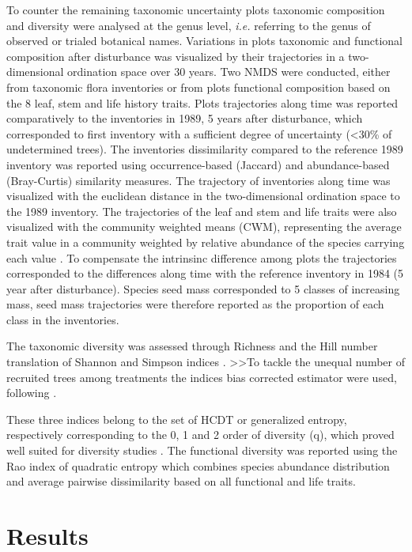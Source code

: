 \documentclass[fleqn,10pt]{ArtEcoFoG} %
\theoremstyle{definition}
\theoremstyle{definition}
\theoremstyle{definition}
\theoremstyle{remark}
\begin{document}
To counter the remaining taxonomic uncertainty plots taxonomic
composition and diversity were analysed at the genus level, \emph{i.e.}
referring to the genus of observed or trialed botanical names.
Variations in plots taxonomic and functional composition after
disturbance was visualized by their trajectories in a two-dimensional
ordination space over 30 years. Two NMDS were conducted, either from
taxonomic flora inventories or from plots functional composition based
on the 8 leaf, stem and life history traits. Plots trajectories along
time was reported comparatively to the inventories in 1989, 5 years
after disturbance, which corresponded to first inventory with a
sufficient degree of uncertainty (\textless{}30\% of undetermined
trees). The inventories dissimilarity compared to the reference 1989
inventory was reported using occurrence-based (Jaccard) and
abundance-based (Bray-Curtis) similarity measures. The trajectory of
inventories along time was visualized with the euclidean distance in the
two-dimensional ordination space to the 1989 inventory. The trajectories
of the leaf and stem and life traits were also visualized with the
community weighted means (CWM), representing the average trait value in
a community weighted by relative abundance of the species carrying each
value \citep{Diaz2007, Garnier2004}. To compensate the intrinsinc
difference among plots the trajectories corresponded to the differences
along time with the reference inventory in 1984 (5 year after
disturbance). Species seed mass corresponded to 5 classes of increasing
mass, seed mass trajectories were therefore reported as the proportion
of each class in the inventories.

The taxonomic diversity was assessed through Richness and the Hill
number translation of Shannon and Simpson indices \citep{Hill1973}.
\textgreater{}\textgreater{}To tackle the unequal number of recruited
trees among treatments the indices bias corrected estimator were used,
following \citep{Chao2015, Marcon2015b}.

These three indices belong to the set of HCDT or generalized entropy,
respectively corresponding to the 0, 1 and 2 order of diversity (q),
which proved well suited for diversity studies
\citep{Patil1982, Tothmeresz1995}. The functional diversity was reported
using the Rao index of quadratic entropy which combines species
abundance distribution and average pairwise dissimilarity based on all
functional and life traits.

\section{Results}\label{results}
\end{document}
